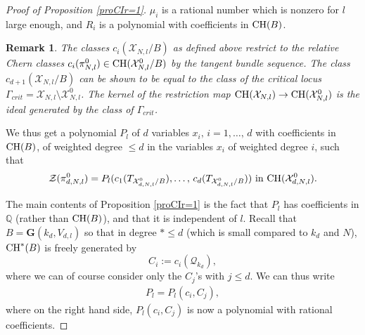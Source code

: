 \documentclass[10pt]{article}
\newtheorem{rema}[theo]{Remark}
\begin{document}
\begin{proof}[Proof of Proposition \ref{proCIr=1}]
  $\mu_i$ is a  rational number which is nonzero for $l$ large enough, and $R_i$ is a polynomial with coefficients in ${\rm CH}(B)$.
 \begin{rema}\label{remaapriouver}{\rm The classes $c_i(\mathcal{X}_{N,l}/B)$ as defined above restrict  to
 the relative Chern classes $c_i(\pi_{N,l}^0)\in{\rm CH}(\mathcal{X}_{N,l}^0/B)$ by the tangent bundle sequence. The class $c_{d+1}(\mathcal{X}_{N,l}/B)$ can be shown to be equal to the class
 of the critical locus $\Gamma_{crit}=\mathcal{X}_{N,l}\setminus \mathcal{X}_{N,l}^0$. The kernel
 of the restriction map ${\rm CH}(\mathcal{X}_{N,l})\rightarrow {\rm CH}(\mathcal{X}_{N,l}^0)$ is the ideal generated by the class of $\Gamma_{crit}$.}
 \end{rema}
 We thus get a polynomial $P_l$ of $d$ variables $x_i,\,i=1,\ldots,\,d$ with coefficients in ${\rm CH}(B)$, of weighted degree $\leq d$ in the variables $x_i$ of weighted degree $i$, such that
 \begin{eqnarray}\label{eqpouZCI} \mathcal{Z}(\pi_{d,N,l}^0)=P_l(c_1(T_{\mathcal{X}^0_{d,N,l}/B}),\ldots,\,c_d(T_{\mathcal{X}^0_{d,N,l}/B}))
 \,\,{\rm in}\,\,{\rm CH}(\mathcal{X}_{d,N,l}^0).
 \end{eqnarray}

 The main contents of Proposition \ref{proCIr=1} is the fact that $P_l$ has coefficients in $\mathbb{Q}$ (rather than ${\rm CH}(B)$), and that it is independent of $l$. Recall that $B=\mathbf{G}(k_d, V_{d,l})$ so that in  degree $*\leq d$ (which is small compared to $k_d$ and $N$), ${\rm CH}^*(B)$ is freely generated by $$C_i:=c_i(\mathcal{Q}_{k_d}),$$
  where we can of course consider only the $C_j$'s with $j\leq d$.
We can thus write
\begin{eqnarray}\label{eqtardtardtard} P_l=P_l(c_i,C_j),\end{eqnarray} where on the right hand side, $P_l(c_i,C_j)$ is now a polynomial with rational coefficients.


\end{proof}
\end{document}
